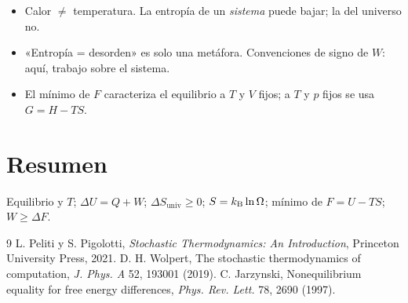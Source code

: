 \documentclass[11pt,a4paper]{article}
\begin{document}
\begin{error}
\begin{itemize}[nosep]
\item Calor $\neq$ temperatura. La entropía de un \emph{sistema} puede bajar; la del universo no.
\item «Entropía = desorden» es solo una metáfora. Convenciones de signo de $W$: aquí, trabajo sobre el sistema.
\item El mínimo de $F$ caracteriza el equilibrio a $T$ y $V$ fijos; a $T$ y $p$ fijos se usa $G=H-TS$.
\end{itemize}
\end{error}

\section{Resumen}
Equilibrio y $T$; $\Delta U=Q+W$; $\Delta S_{\text{univ}}\ge0$; $S=k_{\mathrm B}\ln\Omega$; mínimo de $F=U-TS$; $W\ge\Delta F$.

\begin{thebibliography}{9}\small
{} L. Peliti y S. Pigolotti, \emph{Stochastic Thermodynamics: An Introduction}, Princeton University Press, 2021.
 D. H. Wolpert, The stochastic thermodynamics of computation, \emph{J. Phys. A} 52, 193001 (2019).
 C. Jarzynski, Nonequilibrium equality for free energy differences, \emph{Phys. Rev. Lett.} 78, 2690 (1997).
\end{thebibliography}
\end{document}
